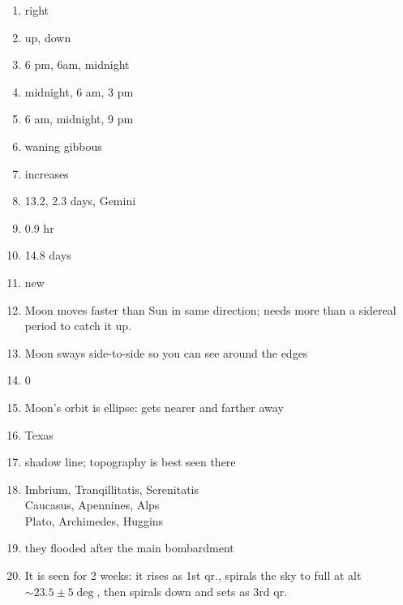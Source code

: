 \documentclass[11pt]{article}
\begin{document}
\begin{enumerate} 

\item 
right


\item
up, down

\item 
6 pm, 6am, midnight

\item 
midnight, 6 am, 3 pm

\item
6 am, midnight, 9 pm

\item 
waning gibbous


\item
increases


\item
13.2, 2.3 days, Gemini

\item
0.9 hr

\item
14.8  days


\item 
new 

\item
Moon moves faster than Sun in same direction; needs more than a
sidereal period to catch it up.

\item
Moon sways side-to-side so you can see around the edges

\item
0\deg




\item
Moon's orbit is ellipse: gets nearer and farther away

\item
Texas


\item 
shadow line; topography is best seen there

\item

Imbrium, Tranqillitatis, Serenitatis \\
Caucasus, Apennines, Alps \\
Plato, Archimedes, Huggins

\item
they flooded after the main bombardment


\item
It is seen for 2 weeks: it rises as 1st qr., spirals the sky to full at
alt $\sim 23.5\pm5\deg$, then spirals down and sets as 3rd qr.


\end{enumerate} 
\end{document}

